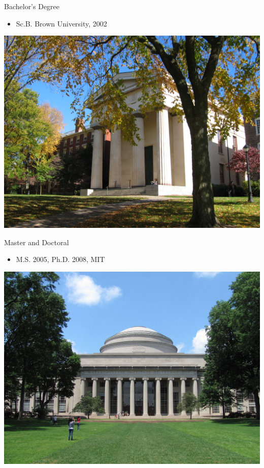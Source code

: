 \documentclass[10pt, svgnames]{beamer}
\begin{document}
\begin{frame}[label={sec:org035fbac}]{Bachelor's Degree}
\begin{itemize}
\item Sc.B. Brown University, 2002
\end{itemize}

\begin{center}
\includegraphics[width=.9\linewidth]{pictures/brown.jpg}
\end{center}
\end{frame}

\begin{frame}[label={sec:orgbb05a09}]{Master and Doctoral}
\begin{itemize}
\item M.S. 2005, Ph.D. 2008, MIT
\end{itemize}

\begin{center}
\includegraphics[width=.9\linewidth]{pictures/mit.jpg}
\end{center}
\end{frame}
\end{document}
